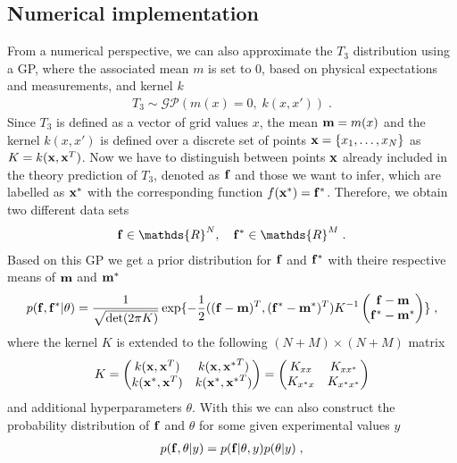 \documentclass[11pt,a4paper]{article}
\begin{document}
\subsection{Numerical implementation}
%
From a numerical perspective, we can also approximate the $T_3$ distribution using a GP, where the associated mean $m$ is set to $0$, based on physical expectations and measurements, and kernel $k$
%
\begin{align}
    T_3 \sim \mathcal{GP}(m(x)=0, \; k(x, x')) \; .
\end{align}
%
Since $T_3$ is defined as a vector of grid values $x$, the mean $\mathbf{m}=m(x)$ and the kernel $k(x, x')$ is defined over a discrete set of points $\mathbf{x} = \{x_1, \dots , x_N\}$ as $K = k(\mathbf{x}, \mathbf{x}^T)$. 
Now we have to distinguish between points $\mathbf{x}$ already included in the theory prediction of $T_3$, denoted as $\mathbf{f}$ and those we want to infer, which are labelled as $\mathbf{x^*}$ with the corresponding function $f(\mathbf{x^*})=\mathbf{f^*}$. Therefore, we obtain two different data sets
%
\begin{align}
    \bff \in \mathds{R}^N, \quad \bffs \in \mathds{R}^M \; .
\end{align}
%
Based on this GP we get a prior distribution for $\mathbf{f}$ and $\mathbf{f^*}$ with theire respective means of $\mathbf{m}$ and $\mathbf{m^*}$
%
\begin{align}
    p(\mathbf{f}, \mathbf{f^*} | \theta) = \frac{1}{\sqrt{\det(2\pi K)}}\exp\{-\frac{1}{2}((\mathbf{f} - \mathbf{m})^T, (\mathbf{f^*} - \mathbf{m^*})^T)K^{-1}
    \begin{pmatrix}
        \mathbf{f} - \mathbf{m}\\ \mathbf{f^*} - \mathbf{m^*}
    \end{pmatrix}
    \} \; ,
\end{align}
%
where the kernel $K$ is extended to the following $(N+M)\times(N+M)$ matrix
%
\begin{align}
    K = \begin{pmatrix}
        k(\mathbf{x}, \mathbf{x}^T) & k(\mathbf{x}, \mathbf{x^*}^T) \\ k(\mathbf{x^*}, \mathbf{x}^T) & k(\mathbf{x^*}, \mathbf{x^*}^T)
    \end{pmatrix}
    = \begin{pmatrix}
        K_{xx} & K_{xx^*} \\ K_{x^*x} & K_{x^*x^*}
    \end{pmatrix}
\end{align}
%
and additional hyperparameters $\theta$.
With this we can also construct the probability distribution of $\mathbf{f}$ and $\theta$ for some given experimental values $y$
%
\begin{align}
    p(\mathbf{f}, \theta | y) = p(\mathbf{f}|\theta, y)p(\theta|y) \; ,
\end{align}
\end{document}
